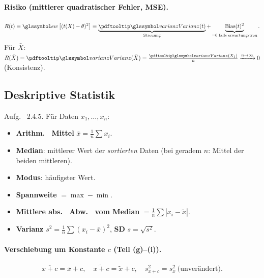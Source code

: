 \paragraph{Risiko (mittlerer quadratischer Fehler, MSE). }
\[
    R(t)=\E{(t(X)-\theta)^2}
    =\underbrace{\Var(t)}_{\text{Streuung}}+\underbrace{\text{Bias}(t)^2}_{=0\text{ falls erwartungstreu}}. 
\]
Für $\bar X$: $R(\bar X)=\Var(\bar X)=\frac{\Var(X_1)}{n}\xrightarrow{n\to\infty}0$
(Konsistenz). 


\subsection{Deskriptive Statistik}\label{subsec:deskriptive-statistik}
Aufg. \ 2.4.5. Für Daten $x_1,\dots,x_n$:
\begin{itemize}
    \item \textbf{Arithm. \ Mittel} $\bar x=\frac1n\sum x_i$. 
    \item \textbf{Median}: mittlerer Wert der \emph{sortierten} Daten
    (bei geradem $n$: Mittel der beiden mittleren). 
    \item \textbf{Modus}: häufigster Wert. 
    \item \textbf{Spannweite} $=\max-\min$. 
    \item \textbf{Mittlere abs. \ Abw. \ vom Median} $=\frac1n\sum|x_i-\tilde x|$. 
    \item \textbf{Varianz} $s^2=\frac1n\sum(x_i-\bar x)^2$, \textbf{SD} $s=\sqrt{s^2}$. 
\end{itemize}

\paragraph{Verschiebung um Konstante $c$ (Teil (g)--(i)). }
\[
    \overline{x+c}=\bar x+c,\quad
    \widetilde{x+c}=\tilde x+c,\quad
    s^2_{x+c}=s^2_x\ \text{(unverändert)}. 
\]

